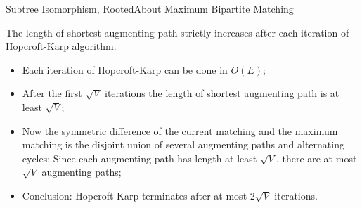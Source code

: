 \documentclass[handout]{beamer}
\begin{document}
\begin{frame}{Subtree Isomorphism, Rooted}{About Maximum Bipartite Matching}
\begin{lemma}
	 The length of shortest augmenting path strictly increases after each iteration of Hopcroft-Karp algorithm.
\end{lemma}

\pause

\begin{itemize}
	\item Each iteration of Hopcroft-Karp can be done in $O(E)$;
	\item After the first $\sqrt{V}$ iterations the length of shortest augmenting path is at least $\sqrt{V}$;
	\item Now the symmetric difference of the current matching and the maximum matching is the disjoint union of several augmenting paths and alternating cycles; Since each augmenting path has length at least $\sqrt{V}$, there are at most $\sqrt{V}$ augmenting paths;
	\item Conclusion: Hopcroft-Karp terminates after at most $2\sqrt{V}$ iterations.
\end{itemize}
\end{frame}
\end{document}
